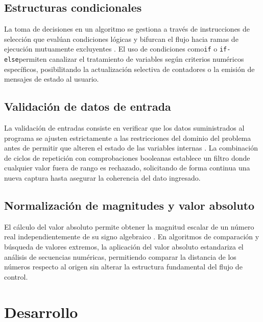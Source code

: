\subsection{Estructuras condicionales}
La toma de decisiones en un algoritmo se gestiona a través de instrucciones de selección que evalúan condiciones lógicas y bifurcan el flujo hacia ramas de ejecución mutuamente excluyentes \cite{joyanes2008}. El uso de condiciones como\texttt{if} o \texttt{if-else}permiten canalizar el tratamiento de variables según criterios numéricos específicos, posibilitando la actualización selectiva de contadores o la emisión de mensajes de estado al usuario.

\subsection{Validación de datos de entrada}
La validación de entradas consiste en verificar que los datos suministrados al programa se ajusten estrictamente a las restricciones del dominio del problema antes de permitir que alteren el estado de las variables internas \cite{joyanes2011}. La combinación de ciclos de repetición con comprobaciones booleanas establece un filtro donde cualquier valor fuera de rango es rechazado, solicitando de forma continua una nueva captura hasta asegurar la coherencia del dato ingresado.

\subsection{Normalización de magnitudes y valor absoluto}
El cálculo del valor absoluto permite obtener la magnitud escalar de un número real independientemente de su signo algebraico \cite{joyanes2008}. En algoritmos de comparación y búsqueda de valores extremos, la aplicación del valor absoluto estandariza el análisis de secuencias numéricas, permitiendo comparar la distancia de los números respecto al origen sin alterar la estructura fundamental del flujo de control.

\section{Desarrollo}

